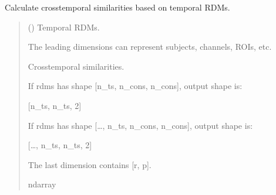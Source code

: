 \documentclass[letterpaper,10pt,english]{sphinxhowto}
\begin{document}
\begin{fulllineitems}
\label{\detokenize{ctcorr_cal:neurora.ctcorr_cal.ctsim_rdms_cal}}
\pysigstartsignatures
{}
\pysigstopsignatures
\sphinxAtStartPar
Calculate cross\sphinxhyphen{}temporal similarities based on temporal RDMs.
\begin{quote}\begin{description}
\sphinxAtStartPar
{} (\sphinxstyleliteralemphasis{\sphinxupquote{, }}\sphinxstyleliteralemphasis{\sphinxupquote{ {[}}}\sphinxstyleliteralemphasis{\sphinxupquote{, }}\sphinxstyleliteralemphasis{\sphinxupquote{, }}\sphinxstyleliteralemphasis{\sphinxupquote{{]} or }}\sphinxstyleliteralemphasis{\sphinxupquote{{[}}}\sphinxstyleliteralemphasis{\sphinxupquote{, }}\sphinxstyleliteralemphasis{\sphinxupquote{, }}\sphinxstyleliteralemphasis{\sphinxupquote{, }}\sphinxstyleliteralemphasis{\sphinxupquote{{]}}}) \textendash{} 
\sphinxAtStartPar
Temporal RDMs.

\sphinxAtStartPar
The leading dimensions can represent subjects, channels, ROIs, etc.


\sphinxAtStartPar

\sphinxAtStartPar
{} \textendash{} Cross\sphinxhyphen{}temporal similarities.

\sphinxAtStartPar
If rdms has shape {[}n\_ts, n\_cons, n\_cons{]}, output shape is:

\sphinxAtStartPar
{[}n\_ts, n\_ts, 2{]}

\sphinxAtStartPar
If rdms has shape {[}…, n\_ts, n\_cons, n\_cons{]}, output shape is:

\sphinxAtStartPar
{[}…, n\_ts, n\_ts, 2{]}

\sphinxAtStartPar
The last dimension contains {[}r, p{]}.


\sphinxAtStartPar
ndarray

\end{description}\end{quote}

\end{fulllineitems}
\end{document}
